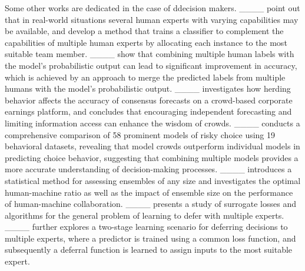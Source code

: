 Some other works are dedicated in the case of ddecision makers. ____ point out that in real-world situations several human experts with varying capabilities may be available, and develop a method that trains a classifier to complement the capabilities of multiple human experts by allocating each instance to the most suitable team member. ____ show that combining multiple human labels with the model's probabilistic output can lead to significant improvement in accuracy, which is achieved by an approach to merge the predicted labels from multiple humans with the model's probabilistic output. 
____ investigates how herding behavior affects the accuracy of consensus forecasts on a crowd-based corporate earnings platform, and concludes that encouraging independent forecasting and limiting information access can enhance the wisdom of crowds. ____ conducts a comprehensive comparison of 58 prominent models of risky choice using 19 behavioral datasets, revealing that model crowds outperform individual models in predicting choice behavior, suggesting that combining multiple models provides a more accurate understanding of decision-making processes.
____ introduces a
statistical method for assessing ensembles of any size and
investigates the optimal human-machine ratio as well as the
impact of ensemble size on the performance of human-machine
collaboration. ____ presents a study of surrogate losses and algorithms for the general problem of learning to defer with multiple experts.
____ further explores a two-stage learning scenario for deferring decisions to multiple experts, where a predictor is trained using a common loss function, and subsequently a deferral function is learned to assign inputs to the most suitable expert. 



